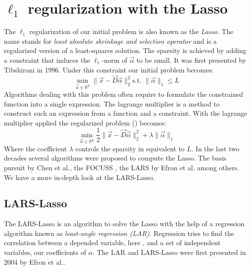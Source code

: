\section { $\ell_1$ regularization with the Lasso}
The $\ell_1$ regularization of our initial problem is also known as the
\emph{Lasso}. The name stands for \emph{least absolute shrinkage and
selection operator} and is a regularized version of a least-squares
solution. The sparsity is achieved by adding a constraint that induces
the $\ell_1$-norm of $\vec{\alpha}$ to be small. It was first
presented by
Tibshirani
in 1996\cite{Tibshirani1996}. Under this constraint our initial problem becomes:
\begin{equation}
\min_{\vec{\alpha}\in\mathbb{R}^{p}} \lVert \vec{x} - \vec{D}\vec{\alpha}
\rVert^{2}_{2} \textrm{
s.t. } \lVert \vec{\alpha} \rVert_{1} \leq L \label{eq:l1}
\end{equation}
Algorithms dealing with this problem often require to formulate the
constrained function into a single expression. The lagrange multiplier is a
method to construct such an expression from a function and a constraint. With
the lagrange multiplier applied the regularized problem ()
becomes:
\begin{equation}
\min_{\vec{\alpha}\in\mathbb{R}^{p}}  \frac{1}{2} \lVert \vec{x} -
\vec{D}\vec{\alpha} \rVert^{2}_{2} +
\lambda \lVert \vec{\alpha} \rVert_{1}\label{eq:l1lagrange}
\end{equation}
Where the coefficient $\lambda$ controls the sparsity in equivalent to $L$.
In the last two decades several algorithms were proposed to compute the
Lasso. The basis pursuit by Chen et al.\cite{Chen1995}, the FOCUSS\cite{FOCUSS}
, the LARS by Efron et al.\cite{Efron2004} among others. We have a more in-depth
look at the LARS-Lasso.


\subsection{LARS-Lasso}
\label{sec:lars}
The LARS-Lasso is an algorithm to solve the Lasso with the help of a regression
algorithm known as \emph{least-angle regression (LAR)}. Regression tries to find
the correlation between a depended variable, here , and
a set of independent variables, our coefficients of $\alpha$.
The LAR and LARS-Lasso were first presented in 2004 by Efron et
al.\cite{Efron2004}.



